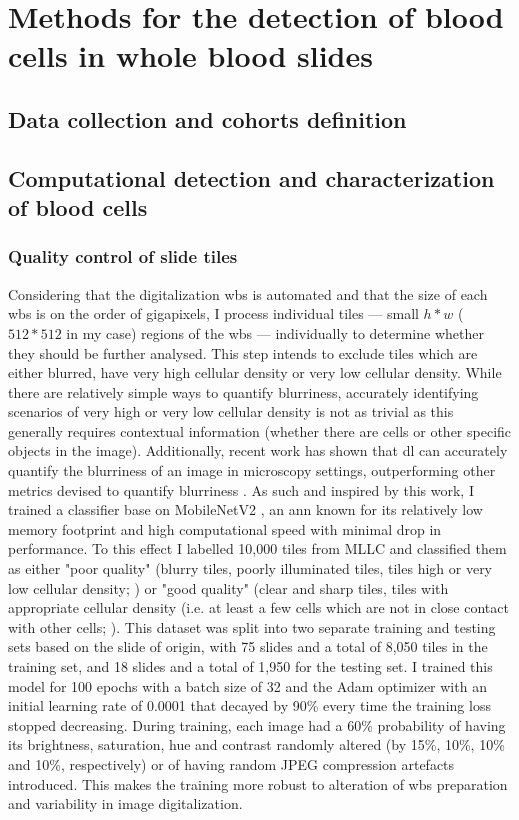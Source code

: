 \section{Methods for the detection of blood cells in whole blood slides}

\subsection{Data collection and cohorts definition}

\subsection{Computational detection and characterization of blood cells}

\subsubsection{Quality control of slide tiles}

Considering that the digitalization \ac{wbs} is automated and that the size of each \ac{wbs} is on the order of gigapixels, I process individual tiles --- small $h*w$ ($512*512$ in my case) regions of the \ac{wbs} --- individually to determine whether they should be further analysed. This step intends to exclude tiles which are either blurred, have very high cellular density or very low cellular density. While there are relatively simple ways to quantify blurriness, accurately identifying scenarios of very high or very low cellular density is not as trivial as this generally requires contextual information (whether there are cells or other specific objects in the image). Additionally, recent work has shown that \ac{dl} can accurately quantify the blurriness of an image in microscopy settings, outperforming other metrics devised to quantify blurriness \cite{Yang2018-ve}. As such and inspired by this work, I trained a classifier base on MobileNetV2 \cite{Sandler2018-bd}, an \ac{ann} known for its relatively low memory footprint and high computational speed with minimal drop in performance. To this effect I labelled 10,000 tiles from MLLC and classified them as either "poor quality" (blurry tiles, poorly illuminated tiles, tiles high or very low cellular density; ) or "good quality" (clear and sharp tiles, tiles with appropriate cellular density (i.e. at least a few cells which are not in close contact with other cells; ). This dataset was split into two separate training and testing sets based on the slide of origin, with 75 slides and a total of 8,050 tiles in the training set, and 18 slides and a total of 1,950 for the testing set. I trained this model for 100 epochs with a batch size of 32 and the Adam optimizer with an initial learning rate of 0.0001 that decayed by 90\% every time the training loss stopped decreasing. During training, each image had a 60\% probability of having its brightness, saturation, hue and contrast randomly altered (by 15\%, 10\%, 10\% and 10\%, respectively) or of having random JPEG compression artefacts introduced. This makes the training more robust to alteration of \ac{wbs} preparation and variability in image digitalization.

